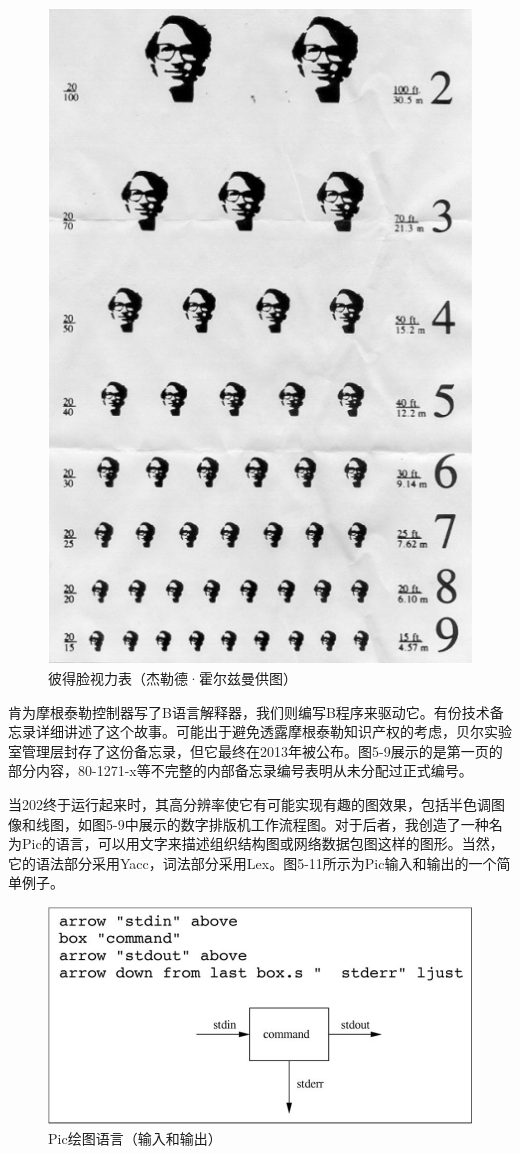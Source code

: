 \documentclass[a4paper,12pt,UTF8,twoside]{ctexbook}
\begin{document}
\begin{figure}[htbp]
	\centering
	\includegraphics[width=0.7\linewidth]{49}
	\caption{彼得脸视力表（杰勒德·霍尔兹曼供图）}
	\label{fig:1}
\end{figure}

肯为摩根泰勒控制器写了B语言解释器，我们则编写B程序来驱动它。有份技术备忘录详细讲述了这个故事。可能出于避免透露摩根泰勒知识产权的考虑，贝尔实验室管理层封存了这份备忘录，但它最终在2013年被公布。图5-9展示的是第一页的部分内容，80-1271-x等不完整的内部备忘录编号表明从未分配过正式编号。

当202终于运行起来时，其高分辨率使它有可能实现有趣的图效果，包括半色调图像和线图，如图5-9中展示的数字排版机工作流程图。对于后者，我创造了一种名为Pic的语言，可以用文字来描述组织结构图或网络数据包图这样的图形。当然，它的语法部分采用Yacc，词法部分采用Lex。图5-11所示为Pic输入和输出的一个简单例子。

\begin{figure}[htbp]
	\centering
	\includegraphics[width=0.7\linewidth]{50}
	\caption{Pic绘图语言（输入和输出）}
	\label{fig:1}
\end{figure}
\end{document}
